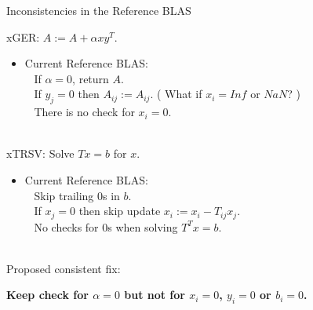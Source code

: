 \documentclass[11pt]{beamer}
\begin{document}
\begin{frame}{Inconsistencies in the Reference BLAS}

	xGER: $A := A + \alpha x y^T$.
	\begin{itemize}
		\item Current Reference BLAS:\\
		~ If $\alpha = 0$, return $A$.\\
		~ If $y_j = 0$ then $A_{ij} := A_{ij}$. ( What if $x_i = Inf$ or $NaN$? )\\
		~ There is no check for $x_i = 0$.
	\end{itemize}

	~\\
	xTRSV: Solve $Tx = b$ for $x$.
	\begin{itemize}
		\item Current Reference BLAS:\\
		~ Skip trailing 0s in $b$.\\
		~ If $x_j = 0$ then skip update $x_i := x_i - T_{ij}x_j$.\\
		~ No checks for 0s when solving $T^Tx = b$.
	\end{itemize}

	~\\
	Proposed consistent fix:
	\begin{center}
		\textbf{Keep check for $\alpha = 0$ but not for $x_i = 0$, $y_i = 0$ or $b_i = 0$.}
	\end{center}


\end{frame}
\end{document}
